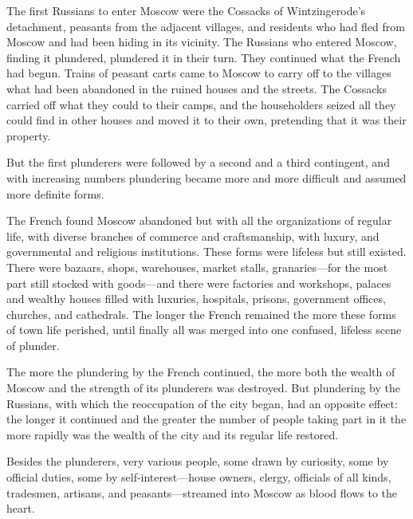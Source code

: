 The first Russians to enter Moscow were the Cossacks of
Wintzingerode's detachment, peasants from the adjacent villages,
and residents who had fled from Moscow and had been hiding in its
vicinity. The Russians who entered Moscow, finding it plundered,
plundered it in their turn. They continued what the French had
begun. Trains of peasant carts came to Moscow to carry off to the
villages what had been abandoned in the ruined houses and the
streets. The Cossacks carried off what they could to their camps,
and the householders seized all they could find in other houses
and moved it to their own, pretending that it was their property.

But the first plunderers were followed by a second and a third
contingent, and with increasing numbers plundering became more
and more difficult and assumed more definite forms.

The French found Moscow abandoned but with all the organizations
of regular life, with diverse branches of commerce and
craftsmanship, with luxury, and governmental and religious
institutions. These forms were lifeless but still existed. There
were bazaars, shops, warehouses, market stalls, granaries---for
the most part still stocked with goods---and there were factories
and workshops, palaces and wealthy houses filled with luxuries,
hospitals, prisons, government offices, churches, and
cathedrals. The longer the French remained the more these forms
of town life perished, until finally all was merged into one
confused, lifeless scene of plunder.

The more the plundering by the French continued, the more both
the wealth of Moscow and the strength of its plunderers was
destroyed. But plundering by the Russians, with which the
reoccupation of the city began, had an opposite effect: the
longer it continued and the greater the number of people taking
part in it the more rapidly was the wealth of the city and its
regular life restored.

Besides the plunderers, very various people, some drawn by
curiosity, some by official duties, some by self-interest---house
owners, clergy, officials of all kinds, tradesmen, artisans, and
peasants---streamed into Moscow as blood flows to the heart.

